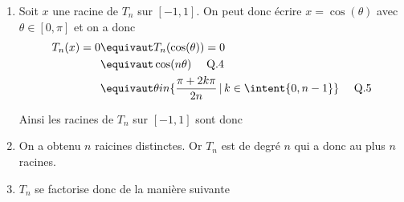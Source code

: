 \documentclass[a4paper, 11pt,reqno]{article}
\begin{document}
\begin{correction}
\begin{enumerate}
\item Soit $x$ une racine de $T_n$ sur $[-1,1]$. On peut donc écrire $x=\cos(\theta) $ avec $\theta \in [0,\pi]$ et on a 
donc 
\begin{align*}
T_n(x)=0 &\equivaut T_n(\cos(\theta))=0 \\
&\equivaut \cos(n\theta) \quad \text{ Q.4} \\
&\equivaut \theta in \{ \frac{\pi+2k\pi}{2n}\, |\, k\in \intent{0,n-1}\} \quad \text{ Q.5} 
\end{align*}

Ainsi les racines de $T_n$ sur $[-1,1]$ sont donc 

\item On a obtenu $n$ raicines distinctes. Or $T_n$ est de degré $n$ qui a donc au plus $n$ racines. 
\item 
$T_n$ se factorise donc de la manière suivante 



\end{enumerate}
\end{correction}


\vspace{3cm}
\end{document}
